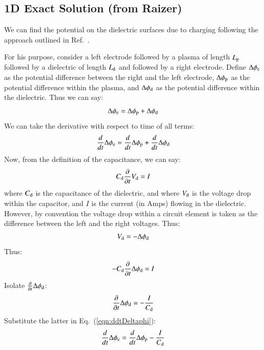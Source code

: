 \documentclass{warpdoc}
\begin{document}
\subsection{1D Exact Solution (from Raizer)}

We can find the potential on the dielectric surfaces due to charging following the approach outlined in Ref.\ \cite{tvt:1989:raizer}.

For his purpose, consider a left electrode followed by a plasma of length $L_{\rm p}$ followed by a dielectric of length $L_{\rm d}$ and followed by a right electrode. Define $\Delta \phi_{\rm e}$ as the potential difference between the right and the left electrode, $\Delta \phi_{\rm p}$ as the potential difference within the plasma, and $\Delta \phi_{\rm d}$ as the potential difference within the dielectric. Thus we can say:
%
\begin{equation}
\Delta \phi_{\rm e} = \Delta \phi_{\rm p}+ \Delta \phi_{\rm d}
\end{equation}
% 
We can take the derivative with respect to time of all terms:
%
\begin{equation}
\frac{d}{d t}\Delta \phi_{\rm e} = \frac{d}{d t}\Delta \phi_{\rm p}+ \frac{d}{d t}\Delta \phi_{\rm d}
\label{eqn:ddtDeltaphi}
\end{equation}
% 
Now, from the definition of the capacitance, we can say:
%
\begin{equation}
  C_{\rm d} \frac{\partial}{\partial t} V_{\rm d} = I
\end{equation}
%
where $C_{\rm d}$ is the capacitance of the dielectric, and where $V_{\rm d}$ is the voltage drop within the capacitor, and $I$ is the current (in Amps) flowing in the dielectric. However, by convention the voltage drop within a circuit element is taken as the difference between the left and the right voltages. Thus:
%
\begin{equation}
 V_{\rm d} = -\Delta \phi_{\rm d}
\end{equation}
%
Thus:
%
\begin{equation}
 - C_{\rm d} \frac{\partial}{\partial t} \Delta \phi_{\rm d} = I
\end{equation}
%
 Isolate $\frac{\partial}{\partial t} \Delta \phi_{\rm d}$:
%
\begin{equation}
   \frac{\partial}{\partial t} \Delta \phi_{\rm d} = -\frac{I}{C_{\rm d}}
\end{equation}
%
Substitute the latter in Eq.\ (\ref{eqn:ddtDeltaphi}):
%
\begin{equation}
\frac{d}{d t}\Delta \phi_{\rm e} = \frac{d}{d t}\Delta \phi_{\rm p}- \frac{I}{C_{\rm d}}
\label{eqn:ddtDeltaphie}
\end{equation}
\end{document}
